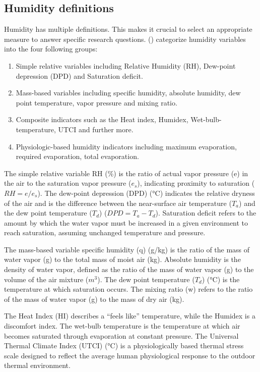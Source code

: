 \documentclass[
]{krantz}
\providecommand{\tightlist}{%
  \setlength{\itemsep}{0pt}\setlength{\parskip}{0pt}}
\begin{document}
\subsection{Humidity definitions}\label{humidity-definitions}

Humidity has multiple definitions. This makes it crucial to select an appropriate measure to answer specific research questions. (\citet{baldwin2023}) categorize humidity variables into the four following groups:

\begin{enumerate}
\def\labelenumi{\arabic{enumi}.}
\tightlist
\item
  Simple relative variables including Relative Humidity (RH), Dew-point depression (DPD) and Saturation deficit.\\
\item
  Mass-based variables including specific humidity, absolute humidity, dew point temperature, vapor pressure and mixing ratio.\\
\item
  Composite indicators such as the Heat index, Humidex, Wet-bulb-temperature, UTCI and further more.\\
\item
  Physiologic-based humidity indicators including maximum evaporation, required evaporation, total evaporation.
\end{enumerate}

The simple relative variable RH (\%) is the ratio of actual vapor pressure (e) in the air to the saturation vapor pressure (\(e_s\)), indicating proximity to saturation (\(RH=e/e_s\)). The dew-point depression (DPD) (°C) indicates the relative dryness of the air and is the difference between the near-surface air temperature (\(T_a\)) and the dew point temperature (\(T_d\)) (\(DPD=T_a-T_d\)). Saturation deficit refers to the amount by which the water vapor must be increased in a given environment to reach saturation, assuming unchanged temperature and pressure.

The mass-based variable specific humidity (q) (g/kg) is the ratio of the mass of water vapor (g) to the total mass of moist air (kg). Absolute humidity is the density of water vapor, defined as the ratio of the mass of water vapor (g) to the volume of the air mixture (\(m^3\)). The dew point temperature (\(T_d\)) (°C) is the temperature at which saturation occurs. The mixing ratio (w) refers to the ratio of the mass of water vapor (g) to the mass of dry air (kg).

The Heat Index (HI) describes a ``feels like'' temperature, while the Humidex is a discomfort index. The wet-bulb temperature is the temperature at which air becomes saturated through evaporation at constant pressure. The Universal Thermal Climate Index (UTCI) (°C) is a physiologically based thermal stress scale designed to reflect the average human physiological response to the outdoor thermal environment.
\end{document}
